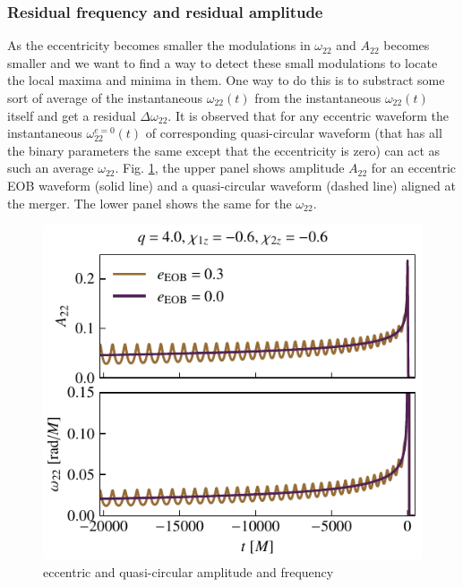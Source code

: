 \documentclass[aps,prd,amsmath,floats,floatfix, twocolumn,
superscriptaddress,nofootinbib,showpacs]{revtex4-1}
\newcommand{\zeroOmega}{\omega_{22}^{e=0}}
\newcommand{\resOmega}{\Delta \omega_{22}}
\begin{document}
\subsubsection{Residual frequency and residual amplitude}
\label{sec:residual-frequency-and-residual-amplitude}
As the eccentricity becomes smaller the modulations in $\omega_{22}$
and $A_{22}$ becomes smaller and we want to find a way to detect these
small modulations to locate the local maxima and minima in them. One
way to do this is to substract some sort of average of the
instantaneous $\omega_{22}(t)$ from the instantaneous $\omega_{22}(t)$
itself and get a residual $\resOmega$. It is observed that for any
eccentric waveform the instantaneous $\zeroOmega(t)$ of corresponding
quasi-circular waveform (that has all the binary parameters the same
except that the eccentricity is zero) can act as such an average
$\omega_{22}$. Fig. \ref{fig:eccentric-and-non-eccentric}, the upper
panel shows amplitude $A_{22}$ for an eccentric EOB waveform (solid
line) and a quasi-circular waveform (dashed line) aligned at the
merger. The lower panel shows the same for the $\omega_{22}$. 

\begin{figure}[htb]
  \centering
  \includegraphics[width=\columnwidth]{ecc_and_zero_ecc}
  \caption{eccentric and quasi-circular amplitude and frequency}
  \label{fig:eccentric-and-non-eccentric}
\end{figure}
\end{document}
